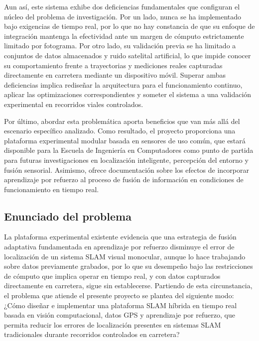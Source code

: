 Aun así, este sistema exhibe dos deficiencias fundamentales que configuran el núcleo del problema de investigación.
Por un lado, nunca se ha implementado bajo exigencias de tiempo real, por lo que no hay constancia de que su enfoque de integración mantenga la efectividad ante un margen de cómputo estrictamente limitado por fotograma.
Por otro lado, su validación previa se ha limitado a conjuntos de datos almacenados y ruido satelital artificial, lo que impide conocer su comportamiento frente a trayectorias y mediciones reales capturadas directamente en carretera mediante un dispositivo móvil.
Superar ambas deficiencias implica rediseñar la arquitectura para el funcionamiento continuo, aplicar las optimizaciones correspondientes y someter el sistema a una validación experimental en recorridos viales controlados.

Por último, abordar esta problemática aporta beneficios que van más allá del escenario específico analizado.
Como resultado, el proyecto proporciona una plataforma experimental modular basada en sensores de uso común, que estará disponible para la Escuela de Ingeniería en Computadores como punto de partida para futuras investigaciones en localización inteligente, percepción del entorno y fusión sensorial. Asimismo, ofrece documentación sobre los efectos de incorporar aprendizaje por refuerzo al proceso de fusión de información en condiciones de funcionamiento en tiempo real.

\subsection{Enunciado del problema}

La plataforma experimental existente evidencia que una estrategia de fusión adaptativa fundamentada en aprendizaje por refuerzo disminuye el error de localización de un sistema SLAM visual monocular, aunque lo hace trabajando sobre datos previamente grabados, por lo que su desempeño bajo las restricciones de cómputo que implica operar en tiempo real, y con datos capturados directamente en carretera, sigue sin establecerse.
Partiendo de esta circunstancia, el problema que atiende el presente proyecto se plantea del siguiente modo: ¿Cómo diseñar e implementar una plataforma SLAM híbrida en tiempo real basada en visión computacional, datos GPS y aprendizaje por refuerzo, que permita reducir los errores de localización presentes en sistemas SLAM tradicionales durante recorridos controlados en carretera?


